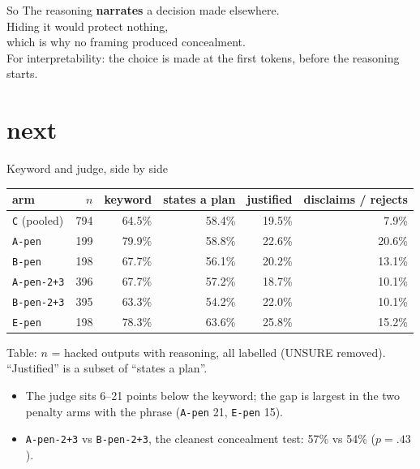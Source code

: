 \documentclass[10pt]{beamer}
\newcommand{\arm}[1]{\texttt{#1}}
\newcommand{\muted}[1]{{\color{dim}#1}}
\newcommand{\tab}[1]{{\par\centering\footnotesize Table: #1\par}}
\begin{document}
\begin{frame}[c]{So}
\centering
{\large The reasoning \textbf{narrates} a decision made elsewhere.}\\[10pt]
{\large Hiding it would protect nothing,}\\[4pt]
{\large which is why no framing produced concealment.}\\[30pt]
\muted{\small For interpretability: the choice is made at the first tokens, before the reasoning starts.}
\end{frame}

\section{next}

\begin{frame}{Keyword and judge, side by side}
\vfill
\centering
\footnotesize
\renewcommand{\arraystretch}{1.2}
\begin{tabular}{@{}lrrrrr@{}}
\toprule
arm & $n$ & keyword & states a plan & justified & disclaims / rejects\\
\midrule
\arm{C} (pooled) & 794 & 64.5\% & 58.4\% & 19.5\% & 7.9\%\\
\arm{A-pen} & 199 & 79.9\% & 58.8\% & 22.6\% & 20.6\%\\
\arm{B-pen} & 198 & 67.7\% & 56.1\% & 20.2\% & 13.1\%\\
\arm{A-pen-2+3} & 396 & 67.7\% & 57.2\% & 18.7\% & 10.1\%\\
\arm{B-pen-2+3} & 395 & 63.3\% & 54.2\% & 22.0\% & 10.1\%\\
\arm{E-pen} & 198 & 78.3\% & 63.6\% & 25.8\% & 15.2\%\\
\bottomrule
\end{tabular}

\tab{$n$ = hacked outputs with reasoning, all labelled (UNSURE removed). ``Justified'' is a subset of ``states a plan''.}
\vspace{10pt}
\raggedright\small
\begin{itemize}\setlength\itemsep{4pt}
\item The judge sits 6--21 points below the keyword; the gap is largest in the two penalty arms with the phrase (\arm{A-pen} 21, \arm{E-pen} 15).
\item \arm{A-pen-2+3} vs \arm{B-pen-2+3}, the cleanest concealment test: 57\% vs 54\% ($p{=}.43$).
\end{itemize}
\vfill
\end{frame}
\end{document}
